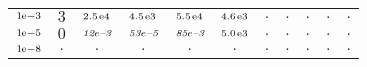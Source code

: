 \begin{tiny}
\begin{tabular}{@{$\;$}c@{$\;$}|@{$\;$}c@{$\;$}@{$\;$}c@{$\;$}@{$\;$}c@{$\;$}@{$\;$}c@{$\;$}@{$\;$}c@{$\;$}|@{$\;$}c@{$\;$}@{$\;$}c@{$\;$}@{$\;$}c@{$\;$}@{$\;$}c@{$\;$}@{$\;$}c@{$\;$}}
$\scriptstyle1\!\mathrm{\hspace{0.10em}e}-3$ & $\scriptstyle3$ & $\scriptstyle2.5\mathrm{\hspace{0.10em}e}4$ & $\scriptstyle4.5\mathrm{\hspace{0.10em}e}3$ & $\scriptstyle5.5\mathrm{\hspace{0.10em}e}4$ & $\scriptstyle4.6\mathrm{\hspace{0.10em}e}3$ & $\scriptstyle.$ & $\scriptstyle.$ & $\scriptstyle.$ & $\scriptstyle.$ & $\scriptstyle.$\\ 
$\scriptstyle1\!\mathrm{\hspace{0.10em}e}-5$ & $\scriptstyle0$ & $\scriptstyle\textit{12}\hspace{0.00em}e\textit{--3}$ & $\scriptstyle\textit{53}\hspace{0.00em}e\textit{--5}$ & $\scriptstyle\textit{85}\hspace{0.00em}e\textit{--3}$ & $\scriptstyle5.0\mathrm{\hspace{0.10em}e}3$ & $\scriptstyle.$ & $\scriptstyle.$ & $\scriptstyle.$ & $\scriptstyle.$ & $\scriptstyle.$\\ 
$\scriptstyle1\!\mathrm{\hspace{0.10em}e}-8$ & $\scriptstyle.$ & $\scriptstyle.$ & $\scriptstyle.$ & $\scriptstyle.$ & $\scriptstyle.$ & $\scriptstyle.$ & $\scriptstyle.$ & $\scriptstyle.$ & $\scriptstyle.$ & $\scriptstyle.$\\ 
\end{tabular} 
\end{tiny} 
